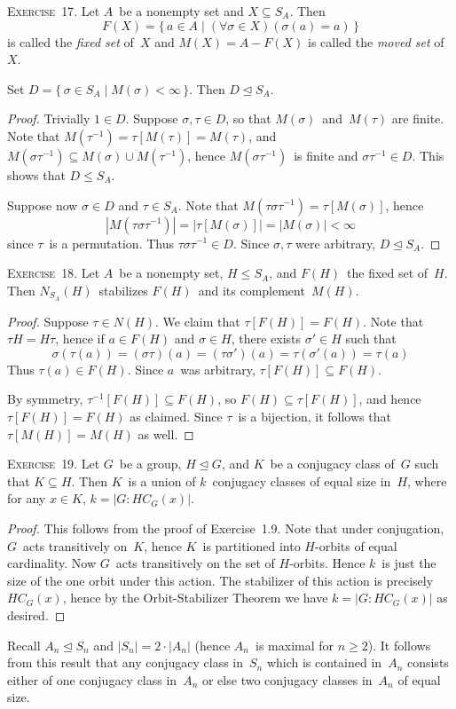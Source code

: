 \documentclass[letterpaper]{article}
\newcommand{\exercise}[1]{\goodbreak\noindent\textsc{Exercise~{#1}.}}
\newcommand{\union}{\cup}
\newcommand{\subgroup}{\le}
\newcommand{\normal}{\trianglelefteq}
\newcommand{\ord}[1]{|{#1}|}
\newcommand{\gindex}[2]{|{#1}:{#2}|}
\begin{document}
\exercise{17}
Let $A$~be a nonempty set and $X\subseteq S_A$. Then
$$F(X)=\{\,a\in A\mid(\forall\sigma\in X)(\sigma(a)=a)\,\}$$
is called the \emph{fixed set} of~$X$ and $M(X)=A-F(X)$ is called the \emph{moved set} of~$X$.

Set $D=\{\,\sigma\in S_A\mid M(\sigma)<\infty\,\}$. Then $D\normal S_A$.
\begin{proof}
Trivially $1\in D$. Suppose $\sigma,\tau\in D$, so that $M(\sigma)$~and~$M(\tau)$ are finite. Note that $M(\tau^{-1})=\tau[M(\tau)]=M(\tau)$, and $M(\sigma\tau^{-1})\subseteq M(\sigma)\union M(\tau^{-1})$, hence $M(\sigma\tau^{-1})$~is finite and $\sigma\tau^{-1}\in D$. This shows that $D\subgroup S_A$.

Suppose now $\sigma\in D$ and $\tau\in S_A$. Note that $M(\tau\sigma\tau^{-1})=\tau[M(\sigma)]$, hence
$$\ord{M(\tau\sigma\tau^{-1})}=\ord{\tau[M(\sigma)]}=\ord{M(\sigma)}<\infty$$
since $\tau$~is a permutation. Thus $\tau\sigma\tau^{-1}\in D$. Since $\sigma,\tau$ were arbitrary, $D\normal S_A$.
\end{proof}

\exercise{18}
Let $A$~be a nonempty set, $H\subgroup S_A$, and $F(H)$~the fixed set of~$H$. Then $N_{S_A}(H)$~stabilizes $F(H)$~and its complement~$M(H)$.
\begin{proof}
Suppose $\tau\in N(H)$. We claim that $\tau[F(H)]=F(H)$. Note that $\tau H=H\tau$, hence if $a\in F(H)$ and $\sigma\in H$, there exists $\sigma'\in H$ such that
$$\sigma(\tau(a))=(\sigma\tau)(a)=(\tau\sigma')(a)=\tau(\sigma'(a))=\tau(a)$$
Thus $\tau(a)\in F(H)$. Since $a$~was arbitrary, $\tau[F(H)]\subseteq F(H)$.

By symmetry, $\tau^{-1}[F(H)]\subseteq F(H)$, so $F(H)\subseteq\tau[F(H)]$, and hence $\tau[F(H)]=F(H)$ as claimed. Since $\tau$~is a bijection, it follows that $\tau[M(H)]=M(H)$ as well.
\end{proof}

\exercise{19}
Let $G$~be a group, $H\normal G$, and $K$~be a conjugacy class of~$G$ such that $K\subseteq H$. Then $K$~is a union of $k$~conjugacy classes of equal size in~$H$, where for any $x\in K$, $k=\gindex{G}{HC_G(x)}$.
\begin{proof}
This follows from the proof of Exercise~1.9. Note that under conjugation, $G$~acts transitively on~$K$, hence $K$~is partitioned into $H$-orbits of equal cardinality. Now $G$~acts transitively on the set of $H$-orbits. Hence $k$~is just the size of the one orbit under this action. The stabilizer of this action is precisely~$HC_G(x)$, hence by the Orbit-Stabilizer Theorem we have $k=\gindex{G}{HC_G(x)}$ as desired.
\end{proof}
\noindent Recall $A_n\normal S_n$ and $\ord{S_n}=2\cdot\ord{A_n}$ (hence $A_n$~is maximal for $n\ge2$). It follows from this result that any conjugacy class in~$S_n$ which is contained in~$A_n$ consists either of one conjugacy class in~$A_n$ or else two conjugacy classes in~$A_n$ of equal size.
\end{document}
